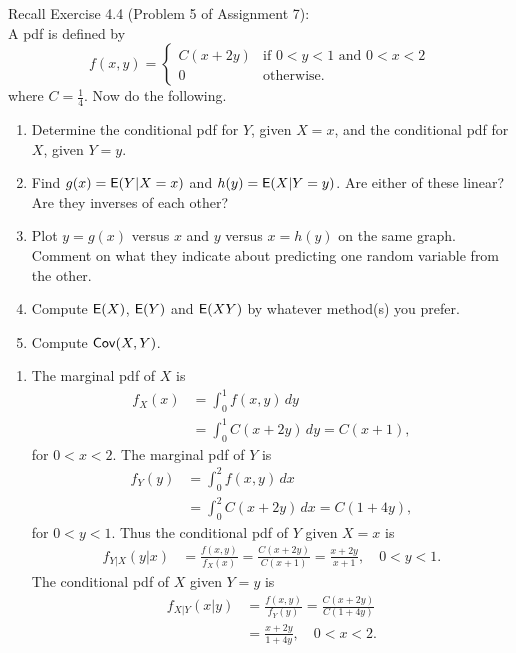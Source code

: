 \documentclass[12pt]{article}
\newcommand{\E}{{\sf E}}
\newcommand{\Cov}{{\sf Cov}}
\newenvironment{problem}[2][Problem]{\begin{trivlist}
\item[\hskip \labelsep {\bfseries #1}\hskip \labelsep {\bfseries #2.}]}
{\end{trivlist}}
\begin{document}
\begin{problem}{5}
  Recall Exercise 4.4 (Problem 5 of Assignment 7):\\
  A pdf is defined by
    \[
      f(x,y) = \begin{cases}
        C(x+2y) & \text{if } 0 < y < 1 \text{ and } 0 < x < 2 \\
        0 & \text{otherwise.}
      \end{cases}
    \]
  where $C = \frac{1}{4}$.
  Now do the following.
  \begin{enumerate}
    \item Determine the conditional pdf for $Y$, given $X = x$, 
    and the conditional pdf for $X$, given
    $Y = y$.
    \item Find $g(x) = \E(Y |X = x)$ and $h(y) = \E(X|Y = y)$. Are either of
    these linear? Are they inverses of each other?
    \item Plot $y = g(x)$ versus $x$ and $y$ versus $x = h(y)$ on 
    the same graph. Comment on what they indicate about predicting 
    one random variable from the other.
    \item Compute $\E(X)$, $\E(Y )$ and $\E(XY )$ by whatever
    method(s) you prefer.
    \item Compute $\Cov(X, Y )$.
  \end{enumerate}
  \begin{enumerate}
    \item The marginal pdf of $X$ is
    \begin{align*}
      f_X(x) &= \int_0^1 f(x,y) \, dy \\
      &= \int_0^1 C(x + 2y) \, dy = C \left(x + 1\right),
    \end{align*}
    for $0 < x < 2$. The marginal pdf of $Y$ is
    \begin{align*}
      f_Y(y) &= \int_0^2 f(x,y) \, dx \\
      &= \int_0^2 C(x + 2y) \, dx = C \left(1 + 4y\right),
    \end{align*}
    for $0 < y < 1$. Thus the conditional pdf of $Y$ given $X = x$ is
    \begin{align*}
      f_{Y|X}(y|x) &= \frac{f(x,y)}{f_X(x)} = \frac{C(x + 2y)}{C(x + 1)} 
      = \frac{x + 2y}{x + 1}, \quad 0 < y < 1.
    \end{align*}
    The conditional pdf of $X$ given $Y = y$ is
    \begin{align*}
      f_{X|Y}(x|y) &= \frac{f(x,y)}{f_Y(y)} = \frac{C(x + 2y)}{C(1 + 4y)} \\
      &= \frac{x + 2y}{1 + 4y}, \quad 0 < x < 2.

\end{align*}
\end{enumerate}
\end{problem}
\end{document}
